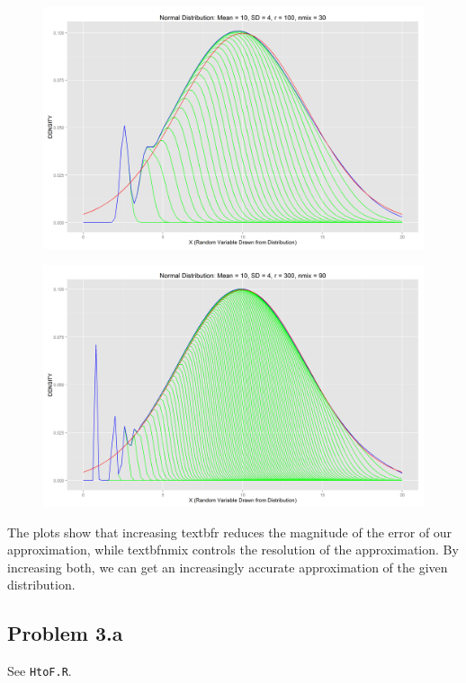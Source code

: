 \documentclass[letter]{article}
\begin{document}
\begin{figure}[H]
\includegraphics[scale=.27]{figures/normdist_10_4_100_30.png}\\
\end{figure}
\begin{figure}[H]
\centering
\includegraphics[scale=.54]{figures/normdist_10_4_300_90.png}
\end{figure}

The plots show that increasing textbf{r} reduces the magnitude of the error of our approximation, while textbf{nmix} controls the resolution of the approximation.  By increasing both, we can get an increasingly accurate approximation of the given distribution.

\subsection*{Problem 3.a}
See \texttt{HtoF.R}. 

\end{document}
